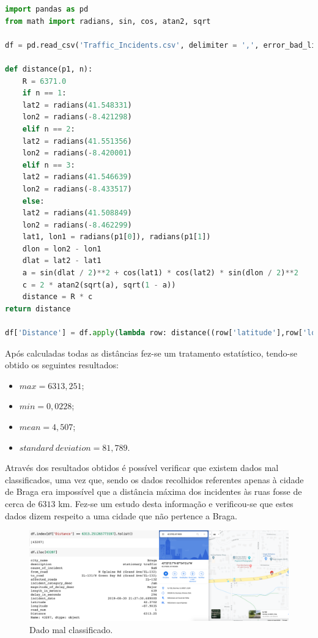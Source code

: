 \documentclass[a4paper, 12pt]{article}
\begin{document}
\begin{lstlisting}[language=Python]
import pandas as pd
from math import radians, sin, cos, atan2, sqrt

df = pd.read_csv('Traffic_Incidents.csv', delimiter = ',', error_bad_lines = False, encoding = 'ISO-8859-1')

def distance(p1, n):
	R = 6371.0
	if n == 1:
	lat2 = radians(41.548331)
	lon2 = radians(-8.421298)
	elif n == 2:
	lat2 = radians(41.551356)
	lon2 = radians(-8.420001)
	elif n == 3:
	lat2 = radians(41.546639)
	lon2 = radians(-8.433517)
	else:
	lat2 = radians(41.508849)
	lon2 = radians(-8.462299)
	lat1, lon1 = radians(p1[0]), radians(p1[1])
	dlon = lon2 - lon1
	dlat = lat2 - lat1
	a = sin(dlat / 2)**2 + cos(lat1) * cos(lat2) * sin(dlon / 2)**2
	c = 2 * atan2(sqrt(a), sqrt(1 - a))
	distance = R * c
return distance

df['Distance'] = df.apply(lambda row: distance((row['latitude'],row['longitude']), row['road_num']), axis=1)
\end{lstlisting}

Após calculadas todas as distâncias fez-se um tratamento estatístico, tendo-se obtido os seguintes resultados:

\begin{itemize}
	\item ${max}= 6313,251$;
	\item ${min}= 0,0228$;
	\item ${mean}= 4,507$;
	\item ${standard \ deviation}= 81,789$.
\end{itemize}

Através dos resultados obtidos é possível verificar que existem dados mal classificados, uma vez que, sendo os dados recolhidos referentes apenas à cidade de Braga era impossível que a distância máxima dos incidentes às ruas fosse de cerca de $6313$ km. Fez-se um estudo desta informação e verificou-se que estes dados dizem respeito a uma cidade que não pertence a Braga.

\begin{figure}[H]
	\centering
	\includegraphics[width=14cm]{EUA}
	\caption{Dado mal classificado.}
\end{figure}
\end{document}
